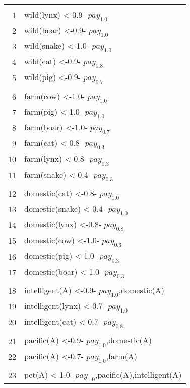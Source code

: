 \documentclass{sigplanconf}
\theoremstyle{definition}
\theoremstyle{plain}
\begin{document}
\begin{figure}[ht]
\begin{center}
\tt
\begin{tabular}{|r@{\hspace{0.2cm}}l|}
\hline
&\\
\scriptsize  1 & wild(lynx) <-0.9- $pay_{1.0}$\\
\scriptsize  2 & wild(boar) <-0.9- $pay_{1.0}$\\
\scriptsize  3 & wild(snake) <-1.0- $pay_{1.0}$\\
\scriptsize  4 & wild(cat) <-0.9- $pay_{0.8}$\\
\scriptsize  5 & wild(pig) <-0.9- $pay_{0.7}$\\
&\\
\scriptsize  6 & farm(cow) <-1.0- $pay_{1.0}$\\
\scriptsize  7 & farm(pig) <-1.0- $pay_{1.0}$\\
\scriptsize  8 & farm(boar) <-1.0- $pay_{0.7}$ \\
\scriptsize  9 & farm(cat) <-0.8- $pay_{0.3}$ \\
\scriptsize 10 & farm(lynx) <-0.8- $pay_{0.3}$ \\
\scriptsize 11 & farm(snake) <-0.4- $pay_{0.3}$ \\
&\\
\scriptsize 12 & domestic(cat) <-0.8- $pay_{1.0}$ \\
\scriptsize 13 & domestic(snake) <-0.4- $pay_{1.0}$ \\
\scriptsize 14 & domestic(lynx) <-0.8- $pay_{0.8}$ \\
\scriptsize 15 & domestic(cow) <-1.0- $pay_{0.3}$ \\
\scriptsize 16 & domestic(pig) <-1.0- $pay_{0.3}$ \\
\scriptsize 17 & domestic(boar) <-1.0- $pay_{0.3}$ \\
&\\
\scriptsize 18 & intelligent(A) <-0.9- $pay_{1.0}$,domestic(A) \\
\scriptsize 19 & intelligent(lynx) <-0.7- $pay_{1.0}$ \\
\scriptsize 20 & intelligent(cat) <-0.7- $pay_{0.8}$ \\
&\\
\scriptsize 21 & pacific(A) <-0.9- $pay_{1.0}$,domestic(A) \\
\scriptsize 22 & pacific(A) <-0.7- $pay_{1.0}$,farm(A) \\
&\\
\scriptsize 23 & pet(A) <-1.0- $pay_{1.0}$,pacific(A),intelligent(A) \\

\end{tabular}
\end{center}
\end{figure}
\end{document}
